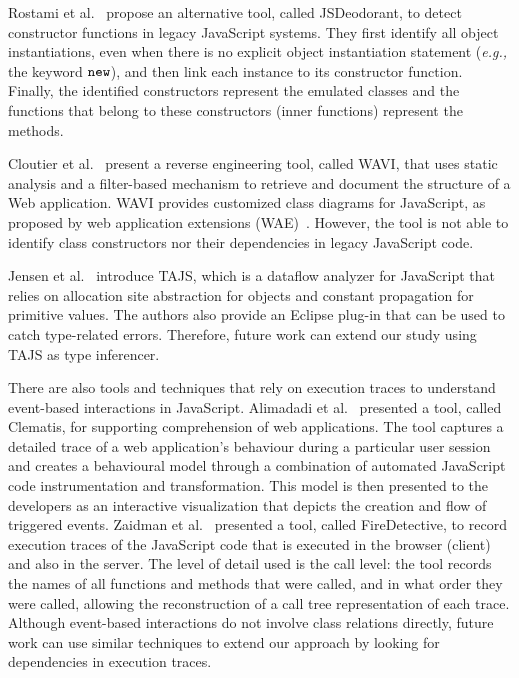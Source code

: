 \documentclass[review]{elsarticle}
\newcommand{\mcode}[1]{$\tt #1$}
\begin{document}
Rostami et al.~\cite{rostami2016} propose an alternative tool, called JSDeodorant, to detect constructor functions in legacy JavaScript systems. They first identify all object instantiations, even when there is no explicit object instantiation statement (\emph{e.g.,} the keyword \mcode{new}), and then link each instance to its constructor function. Finally, the identified constructors represent the emulated classes and the functions that belong to these constructors (inner functions) represent the methods.

Cloutier et al.~\cite{wavi2016} present a reverse engineering tool, called WAVI, that uses static analysis and a filter-based mechanism to retrieve and document the structure of a Web
application. WAVI provides customized class diagrams for JavaScript, as proposed by web application extensions (WAE)~\cite{wae-conallen-2002}. However, the tool is not able to identify class constructors nor their dependencies in legacy JavaScript code. 

Jensen et al.~\cite{tajs2009,lazypropagation2010} introduce TAJS, which is a dataflow analyzer for JavaScript that relies on allocation site abstraction for objects and constant propagation for primitive values. The authors also provide an Eclipse plug-in that can be used to catch type-related errors. Therefore, future work can extend our study using TAJS as type inferencer.

There are also tools and techniques that rely on execution traces to understand event-based interactions in JavaScript. Alimadadi et al.~\cite{clematis2014} presented a tool, called Clematis, for supporting comprehension of web applications. The tool captures a detailed trace of a web application's behaviour during a particular user session and creates a behavioural model through a combination of automated JavaScript code instrumentation and transformation. This model is then presented to the developers as an interactive visualization that depicts the creation and flow of triggered events. Zaidman et al.~\cite{zaidman-2013} presented a tool, called FireDetective, to record execution traces of the JavaScript code that is executed in the browser (client) and also in the server. The level of detail used is the call level: the tool records the names of all functions and methods that were called, and in what order they were called, allowing the reconstruction of a call tree representation of each trace. Although event-based interactions do not involve class relations directly, future work can use similar techniques to extend our approach by looking for dependencies in execution traces. 
\end{document}
